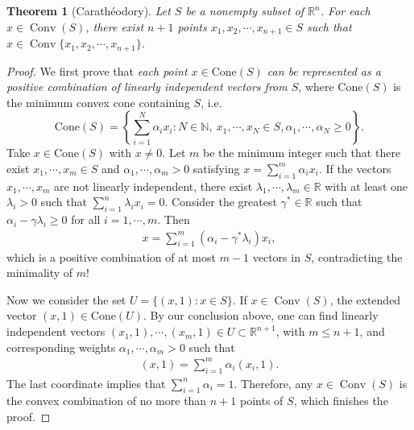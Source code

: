 \documentclass{article}
\numberwithin{equation}{section}
\newcommand{\bbN}{\mathbb{N}}
\newcommand{\bbR}{\mathbb{R}}
\DeclareMathOperator{\conv}{Conv}
\theoremstyle{plain}
\newtheorem{theorem}{Theorem}[section]
\theoremstyle{definition}
\begin{document}
\begin{theorem}[Carathéodory]
Let $S$ be a nonempty subset of $\bbR^n$. For each $x\in\conv(S)$, there exist $n+1$ points $x_1,x_2,\cdots,x_{n+1}\in S$ such that $x\in\conv\{x_1,x_2,\cdots,x_{n+1}\}$.
\end{theorem}
\begin{proof}
We first prove that \textit{each point $x\in\mathrm{Cone}(S)$ can be represented as a positive combination of linearly independent vectors from $S$}, where $\mathrm{Cone}(S)$ is the minimum convex cone containing $S$, i.e.
$$\mathrm{Cone}(S)=\left\{\sum_{i=1}^N\alpha_ix_i:N\in\bbN,\ x_1,\cdots,x_N\in S,\alpha_1,\cdots,\alpha_N\geq 0\right\}.$$ 
Take $x\in\mathrm{Cone}(S)$ with $x\neq 0$. Let $m$ be the minimum integer such that there exist $x_1,\cdots,x_m\in S$ and $\alpha_1,\cdots,\alpha_m>0$ satisfying $x=\sum_{i=1}^m\alpha_ix_i$. If the vectors $x_1,\cdots,x_m$ are not linearly independent, there exist $\lambda_1,\cdots,\lambda_m\in\bbR$ with
at least one $\lambda_i>0$ such that $\sum_{i=1}^n\lambda_ix_i=0$. Consider the greatest $\gamma^*\in\bbR$ such that $\alpha_i-\gamma\lambda_i\geq 0$ for all $i=1,\cdots,m$. Then
\begin{align*}
	x=\sum_{i=1}^m(\alpha_i-\gamma^*\lambda_i)x_i,
\end{align*}
which is a positive combination of at most $m-1$ vectors in $S$, contradicting the minimality of $m$! 

Now we consider the set $U=\{(x,1):x\in S\}$. If $x\in\conv(S)$, the extended vector $(x,1)\in\mathrm{Cone}(U)$. By our conclusion above, one can find linearly independent vectors $(x_1,1),\cdots,(x_m,1)\in U\subset\bbR^{n+1}$, with $m\leq n+1$, and corresponding weights $\alpha_1,\cdots,\alpha_m>0$ such that
\begin{align*}
	(x,1)=\sum_{i=1}^m\alpha_i(x_i,1).
\end{align*}
The last coordinate implies that $\sum_{i=1}^n\alpha_i=1$. Therefore, any $x\in\conv(S)$ is the convex combination of no more than $n+1$ points of $S$, which finishes the proof.
\end{proof}
\end{document}
